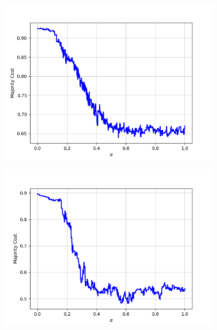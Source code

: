 \begin{figure}[H]
\begin{minipage}{.24\textwidth}
  {\includegraphics[width=\linewidth]{plots/omniglot-intra-sc-cnn/Arcadian}}
\end{minipage}
\begin{minipage}{.24\textwidth}
  \centering
  {\includegraphics[width=\linewidth]{plots/omniglot-intra-sc-cnn/Armenian}}
\end{minipage}
\begin{minipage}{.24\textwidth}
  \centering

\end{minipage}
\end{figure}
